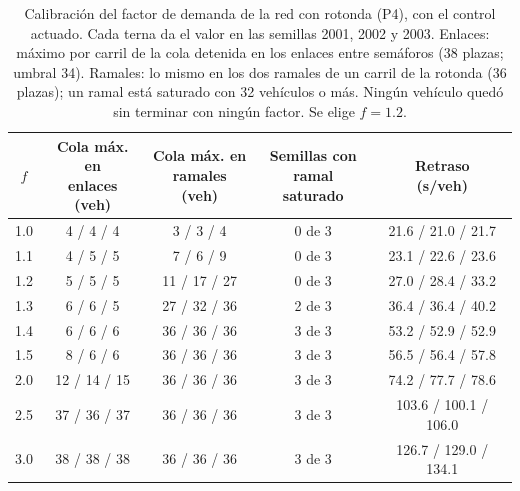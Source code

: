 \begin{table}[H]
\centering
\footnotesize
\setlength{\tabcolsep}{4pt}
\begin{tabular}{ccccc}
\toprule
$f$ & \makecell{Cola máx. en\\enlaces (veh)} & \makecell{Cola máx. en\\ramales (veh)} & \makecell{Semillas con\\ramal saturado} & \makecell{Retraso\\(s/veh)} \\
\midrule
1.0 & 4 / 4 / 4    & 3 / 3 / 4    & 0 de 3 & 21.6 / 21.0 / 21.7    \\
1.1 & 4 / 5 / 5    & 7 / 6 / 9    & 0 de 3 & 23.1 / 22.6 / 23.6    \\
1.2 & 5 / 5 / 5    & 11 / 17 / 27 & 0 de 3 & 27.0 / 28.4 / 33.2    \\
1.3 & 6 / 6 / 5    & 27 / 32 / 36 & 2 de 3 & 36.4 / 36.4 / 40.2    \\
1.4 & 6 / 6 / 6    & 36 / 36 / 36 & 3 de 3 & 53.2 / 52.9 / 52.9    \\
1.5 & 8 / 6 / 6    & 36 / 36 / 36 & 3 de 3 & 56.5 / 56.4 / 57.8    \\
2.0 & 12 / 14 / 15 & 36 / 36 / 36 & 3 de 3 & 74.2 / 77.7 / 78.6    \\
2.5 & 37 / 36 / 37 & 36 / 36 / 36 & 3 de 3 & 103.6 / 100.1 / 106.0 \\
3.0 & 38 / 38 / 38 & 36 / 36 / 36 & 3 de 3 & 126.7 / 129.0 / 134.1 \\
\bottomrule
\end{tabular}
\caption[Calibración de la demanda alta de la red con rotonda (P4)]{Calibración del factor de
demanda de la red con rotonda (P4), con el control actuado. Cada terna da el valor en las semillas
2001, 2002 y 2003. Enlaces: máximo por carril de la cola detenida en los enlaces entre semáforos
(38 plazas; umbral 34). Ramales: lo mismo en los dos ramales de un carril de la rotonda (36
plazas); un ramal está saturado con 32 vehículos o más. Ningún vehículo quedó sin terminar con
ningún factor. Se elige $f = 1.2$.}
\label{tab:red-alta-factor}
\end{table}

